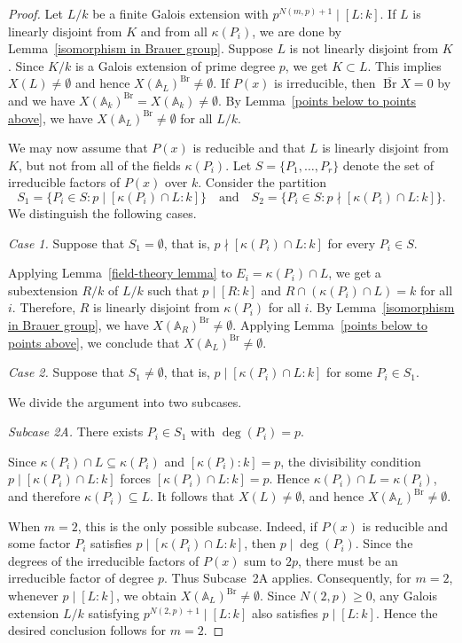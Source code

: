 \documentclass[10pt]{amsart}
\theoremstyle{plain}
\theoremstyle{definition}
\newcommand{\A}{{\mathbb A}}
\newcommand{\Br}{\operatorname{Br}}
\begin{document}
\begin{proof}
Let $L/k$ be a finite Galois extension with $p^{N(m,p)+1} \mid [L:k]$. If $L$ is linearly disjoint from $K$ and from all $\kappa(P_i)$, we are done by Lemma~\ref{isomorphism in Brauer group}. Suppose $L$ is not linearly disjoint from $K$. Since $K/k$ is a Galois extension of prime degree $p$, we get $K\subset L$. This implies $X(L)\neq\emptyset$ and hence $X(\A_L)^{\Br}\neq\emptyset$. If $P(x)$ is irreducible, then $\overline{\Br}X=0$ by \cite[Corollary 3.3]{AVB} and we have $X(\A_k)^{\Br}=X(\A_k)\neq\emptyset$. By Lemma~\ref{points below to points above}, we have $X(\A_L)^{\Br}\neq\emptyset$ for all $L/k$.

We may now assume that $P(x)$ is reducible and that $L$ is linearly disjoint from $K$, but not from all of the fields $\kappa(P_i)$. Let $S=\{P_1,\dots,P_r\}$ denote the set of irreducible factors of $P(x)$ over $k$. Consider the partition
$$
S_1=\{P_i\in S : p\mid [\kappa(P_i)\cap L:k]\}
\quad \text{and} \quad
S_2=\{P_i\in S : p\nmid [\kappa(P_i)\cap L:k]\}.
$$
We distinguish the following cases.

\noindent\textit{Case 1.} Suppose that $S_1=\emptyset$, that is, $p\nmid [\kappa(P_i)\cap L:k]$ for every $P_i\in S$. 

Applying Lemma~\ref{field-theory lemma} to $E_i=\kappa(P_i) \cap L$, we get a subextension $R/k$ of $L/k$ such that $p \mid [R:k]$ and $R \cap (\kappa(P_i)\cap L)=k$ for all $i$. Therefore, $R$ is linearly disjoint from $\kappa(P_i)$ for all $i$. By Lemma~\ref{isomorphism in Brauer group}, we have $X(\A_R)^{\Br}\neq\emptyset$. Applying Lemma~\ref{points below to points above}, we conclude that $X(\A_L)^{\Br}\neq\emptyset$.


\noindent\textit{Case 2.} Suppose that $S_1\neq\emptyset$, that is, $p\mid [\kappa(P_i)\cap L:k]$ for some $P_i\in S_1$.

We divide the argument into two subcases. 

\smallskip

\noindent\textit{Subcase 2A.} There exists \(P_i\in S_1\) with
\(\deg(P_i)=p\).

Since \(\kappa(P_i)\cap L\subseteq \kappa(P_i)\) and
\([\kappa(P_i):k]=p\), the divisibility condition \(p\mid [\kappa(P_i)\cap L:k]\)
forces \([\kappa(P_i)\cap L:k]=p\). Hence \(\kappa(P_i)\cap L=\kappa(P_i)\), and therefore \(\kappa(P_i)\subseteq L\). It follows that \(X(L)\neq\emptyset\), and hence
\(X(\A_L)^{\Br}\neq\emptyset\).

When \(m=2\), this is the only possible subcase. Indeed, if \(P(x)\) is
reducible and some factor \(P_i\) satisfies \(p\mid [\kappa(P_i)\cap L:k]\),
then \(p\mid \deg(P_i)\). Since the degrees of the irreducible factors of
\(P(x)\) sum to \(2p\), there must be an irreducible factor of degree \(p\).
Thus Subcase~2A applies. Consequently, for \(m=2\), whenever \(p\mid [L:k]\), we obtain
\(X(\A_L)^{\Br}\neq\emptyset\). Since \(N(2,p)\ge 0\), any Galois extension \(L/k\) satisfying \(p^{N(2,p)+1}\mid [L:k]\) also satisfies \(p\mid [L:k]\). Hence the desired conclusion follows for \(m=2\).


\end{proof}
\end{document}

